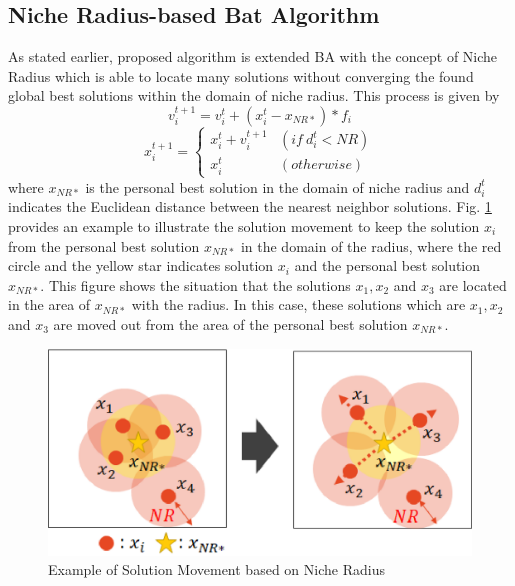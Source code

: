 \documentclass[conference]{IEEEtran}
\begin{document}
\subsection{Niche Radius-based Bat Algorithm}
As stated earlier, proposed algorithm is extended BA with the concept of Niche Radius which is able to locate many solutions without converging the found global best solutions within the domain of niche radius. This process is given by
\begin{equation}
\label{eq:nrvi}
v_i^{t+1}=v_i^t+(x_i^t-x_{NR*})*f_i
\end{equation}
\begin{equation}
\label{eq:nrxi}
x_i^{t+1}= \begin{cases}
x_i^t+v_i^{t+1} & (if \ d_i^t < NR) \\
x_i^t & (otherwise)
\end{cases}
\end{equation}
where $x_{NR*}$ is the personal best solution in the domain of niche radius and $d_i^t$ indicates the Euclidean distance between the nearest neighbor solutions. Fig. \ref{fig:niche} provides an example to illustrate the solution movement to keep the solution $x_i$ from the personal best solution $x_{NR*}$ in the domain of the radius, where the red circle and the yellow star indicates solution $x_i$ and the personal best solution $x_{NR*}$. This figure shows the situation that the solutions $x_1, x_2 $ and $ x_3$ are located in the area of $x_{NR*}$ with the radius. In this case, these solutions which are $x_1, x_2$and $x_3$ are moved out from the area of the personal best solution $x_{NR*}$.

\begin{figure}[h]
\begin{center}
\includegraphics[width=0.8\linewidth]{eps/niche.eps}
\end{center}
\caption{Example of Solution Movement based on Niche Radius}
\label{fig:niche}
\end{figure}
\end{document}
